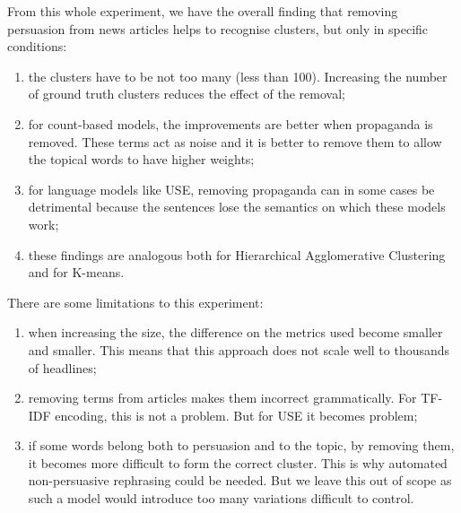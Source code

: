From this whole experiment, we have the overall finding that removing persuasion from news articles helps to recognise clusters, but only in specific conditions:
\begin{enumerate}
    \item the clusters have to be not too many (less than 100). Increasing the number of ground truth clusters reduces the effect of the removal;
    \item for count-based models, the improvements are better when propaganda is removed. These terms act as noise and it is better to remove them to allow the topical words to have higher weights;
    \item for language models like USE, removing propaganda can in some cases be detrimental because the sentences lose the semantics on which these models work;
    \item these findings are analogous both for Hierarchical Agglomerative Clustering and for K-means.
\end{enumerate}


There are some limitations to this experiment:

\begin{enumerate}
    \item when increasing the size, the difference on the metrics used become smaller and smaller. This means that this approach does not scale well to thousands of headlines;
    \item removing terms from articles makes them incorrect grammatically. For TF-IDF encoding, this is not a problem. But for USE it becomes problem;
    \item if some words belong both to persuasion and to the topic, by removing them, it becomes more difficult to form the correct cluster. This is why automated non-persuasive rephrasing could be needed. But we leave this out of scope as such a model would introduce too many variations difficult to control. %
\end{enumerate}

